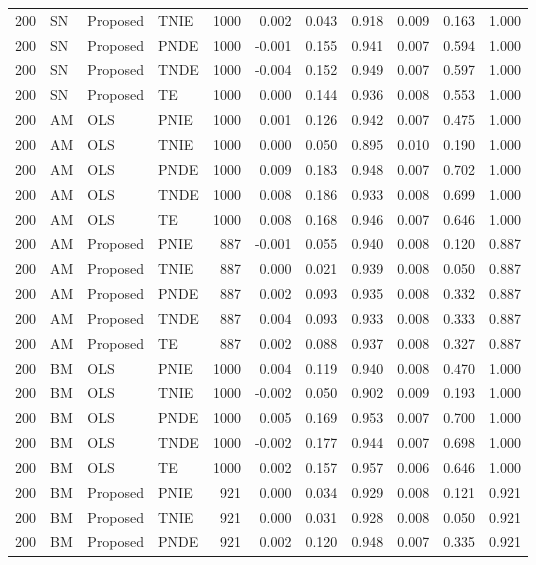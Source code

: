 \begin{longtable}{rlllrrrrrrr}
200 & SN & Proposed & TNIE & 1000 & 0.002 & 0.043 & 0.918 & 0.009 & 0.163 & 1.000 \\
200 & SN & Proposed & PNDE & 1000 & -0.001 & 0.155 & 0.941 & 0.007 & 0.594 & 1.000 \\
200 & SN & Proposed & TNDE & 1000 & -0.004 & 0.152 & 0.949 & 0.007 & 0.597 & 1.000 \\
200 & SN & Proposed & TE & 1000 & 0.000 & 0.144 & 0.936 & 0.008 & 0.553 & 1.000 \\
200 & AM & OLS & PNIE & 1000 & 0.001 & 0.126 & 0.942 & 0.007 & 0.475 & 1.000 \\
200 & AM & OLS & TNIE & 1000 & 0.000 & 0.050 & 0.895 & 0.010 & 0.190 & 1.000 \\
200 & AM & OLS & PNDE & 1000 & 0.009 & 0.183 & 0.948 & 0.007 & 0.702 & 1.000 \\
200 & AM & OLS & TNDE & 1000 & 0.008 & 0.186 & 0.933 & 0.008 & 0.699 & 1.000 \\
200 & AM & OLS & TE & 1000 & 0.008 & 0.168 & 0.946 & 0.007 & 0.646 & 1.000 \\
200 & AM & Proposed & PNIE & 887 & -0.001 & 0.055 & 0.940 & 0.008 & 0.120 & 0.887 \\
200 & AM & Proposed & TNIE & 887 & 0.000 & 0.021 & 0.939 & 0.008 & 0.050 & 0.887 \\
200 & AM & Proposed & PNDE & 887 & 0.002 & 0.093 & 0.935 & 0.008 & 0.332 & 0.887 \\
200 & AM & Proposed & TNDE & 887 & 0.004 & 0.093 & 0.933 & 0.008 & 0.333 & 0.887 \\
200 & AM & Proposed & TE & 887 & 0.002 & 0.088 & 0.937 & 0.008 & 0.327 & 0.887 \\
200 & BM & OLS & PNIE & 1000 & 0.004 & 0.119 & 0.940 & 0.008 & 0.470 & 1.000 \\
200 & BM & OLS & TNIE & 1000 & -0.002 & 0.050 & 0.902 & 0.009 & 0.193 & 1.000 \\
200 & BM & OLS & PNDE & 1000 & 0.005 & 0.169 & 0.953 & 0.007 & 0.700 & 1.000 \\
200 & BM & OLS & TNDE & 1000 & -0.002 & 0.177 & 0.944 & 0.007 & 0.698 & 1.000 \\
200 & BM & OLS & TE & 1000 & 0.002 & 0.157 & 0.957 & 0.006 & 0.646 & 1.000 \\
200 & BM & Proposed & PNIE & 921 & 0.000 & 0.034 & 0.929 & 0.008 & 0.121 & 0.921 \\
200 & BM & Proposed & TNIE & 921 & 0.000 & 0.031 & 0.928 & 0.008 & 0.050 & 0.921 \\
200 & BM & Proposed & PNDE & 921 & 0.002 & 0.120 & 0.948 & 0.007 & 0.335 & 0.921 \\

\end{longtable}

